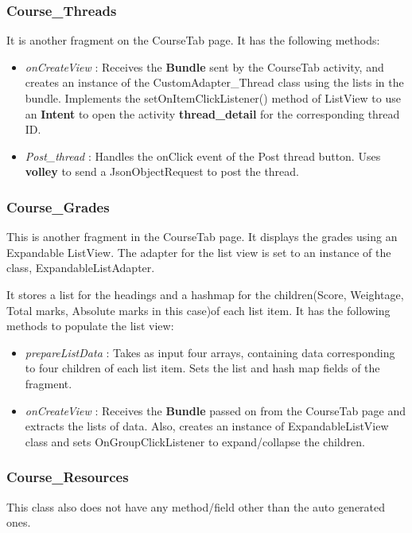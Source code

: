 \documentclass{article}
\begin{document}
\subsubsection{Course\_Threads}
\par\noindent It is another fragment on the CourseTab page. It has the following methods:
\begin{itemize}
\item \textit{onCreateView} : Receives the \textbf{Bundle} sent by the CourseTab activity, and creates an instance of the CustomAdapter\_Thread class using the lists in the bundle. Implements the setOnItemClickListener() method of ListView to use an \textbf{Intent} to open the activity \textbf{thread\_detail} for the corresponding thread ID.

\item \textit{Post\_thread} :  Handles the onClick event of the Post thread button. Uses \textbf{volley} to send a JsonObjectRequest to post the thread.
\end{itemize}

\subsubsection{Course\_Grades}
\par\noindent This is another fragment in the CourseTab page. It displays the grades using an Expandable ListView. The adapter for the list view is set to an instance of the class, ExpandableListAdapter.
\par\noindent It stores a list for the headings and a hashmap for the children(Score, Weightage, Total marks, Absolute marks in this case)of each list item.
It has the following methods to populate the list view:
\begin{itemize}
\item \textit{prepareListData} : Takes as input four arrays, containing data corresponding to four children of each list item. Sets the list and hash map fields of the fragment.
\item \textit{onCreateView} : Receives the \textbf{Bundle} passed on from the CourseTab page and extracts the lists of data. Also, creates an instance of ExpandableListView class and sets OnGroupClickListener to expand/collapse the children.
\end{itemize}

\subsubsection{Course\_Resources}
\par\noindent This class also does not have any method/field other than the auto generated ones.
\end{document}
